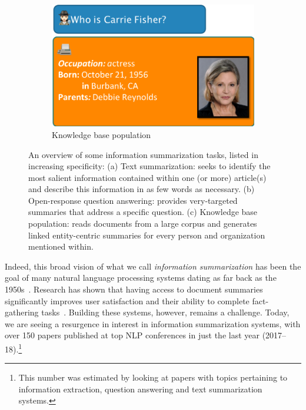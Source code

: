 \begin{figure}[!p]
  \begin{subfigure}[b]{.42\textwidth}
    \includegraphics[width=\textwidth]{figures/task_kbp}
    \caption{Knowledge base population}
  \end{subfigure}

  \caption[Overview of some information summarization tasks]{\label{fig:intro:overview} An overview of some information summarization tasks, listed in increasing specificity:
  (a) Text summarization: seeks to identify the most salient information contained within one (or more) article(s) and describe this information in as few words as necessary.
  (b) Open-response question answering: provides very-targeted summaries that address a specific question.
  (c) Knowledge base population: reads documents from a large corpus and generates linked entity-centric summaries for every person and organization mentioned within.
  }
\end{figure}

Indeed, this broad vision of what we call \textit{information summarization} has been the goal of many natural language processing systems dating as far back as the 1950s~\citep{luhn1958automatic}.
Research has shown that having access to document summaries significantly improves user satisfaction and their ability to complete fact-gathering tasks~\citep{mani1999tipster, mckeown2005summaries}. 
Building these systems, however, remains a challenge.
Today, we are seeing a resurgence in interest in information summarization systems, with over 150 papers published at top NLP conferences in just the last year (2017--18).\footnote{%
This number was estimated by looking at papers with topics pertaining to information extraction, question answering and text summarization systems.} 


